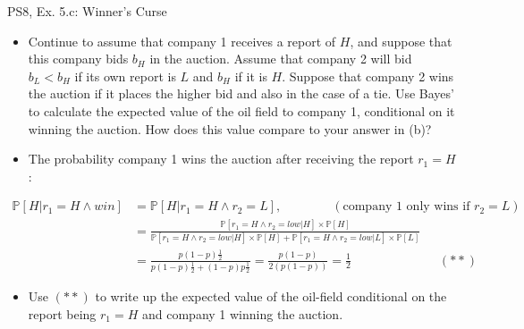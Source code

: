 \begin{frame}{PS8, Ex. 5.c: Winner's Curse}
      \begin{itemize}
        \item[(c)] Continue to assume that company 1 receives a report of $H$, and suppose that this company bids $b_H$ in the auction. Assume that company 2 will bid $b_L < b_H$ if its own report is $L$ and $b_H$ if it is $H$. Suppose that company 2 wins the auction if it places the higher bid and also in the case of a tie. Use Bayes’ to calculate the expected value of the oil field to company 1, conditional on it winning the auction. How does this value compare to your answer in (b)?
        \item[Step 1:] The probability company 1 wins the auction after receiving the report $r_1=H$:
        \end{itemize}
        \vspace{-12pt}
        \begin{align*}
          \mathbb{P}[H|r_1=H\wedge win]&=\mathbb{P}[H|r_1=H\wedge r_2=L],\quad\quad\quad\quad(\text{company 1 only wins if }r_2=L)\\
            &=\frac{\mathbb{P}[r_1=H\wedge r_2=low|H]\times\mathbb{P}[H]}{\mathbb{P}[r_1=H\wedge r_2=low|H]\times\mathbb{P}[H]+\mathbb{P}[r_1=H\wedge r_2=low|L]\times\mathbb{P}[L]}&\\
            &=\frac{p(1-p)\frac{1}{2}}{p(1-p)\frac{1}{2}+(1-p)p\frac{1}{2}}=\frac{p(1-p)}{2(p(1-p))}=\frac{1}{2}\quad\quad\quad\quad\quad\quad\quad(**)
        \end{align*}
        \vspace{-12pt}
        \begin{itemize}
        \item[Step 2:] Use $(**)$ to write up the expected value of the oil-field conditional on the report being $r_1=H$ and company 1 winning the auction.
      \end{itemize}
      \vfill\null
\end{frame}
